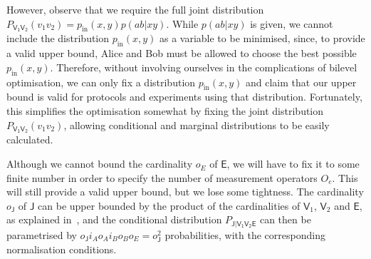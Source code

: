 \documentclass[10pt, a4paper]{article}
\numberwithin{equation}{section} %
\theoremstyle{definition}
\theoremstyle{plain}
\newcommand{\?}{\mathrel{?}} %
\newcommand{\crv}[1]{\mathsf{#1}}
\newcommand{\prin}[1][p]{#1_{\mathrm{in}}}
\begin{document}
                        However, observe that we require the full joint distribution \(P_{\crv{V_1V_2}}(v_1v_2) = \prin(x,y)p(ab|xy)\). While \(p(ab|xy)\) is given, we cannot include the distribution \(\prin(x,y)\) as a variable to be minimised, since, to provide a valid upper bound, Alice and Bob must be allowed to choose the best possible \(\prin(x,y)\). Therefore, without involving ourselves in the complications of bilevel optimisation, we can only fix a distribution \(\prin(x,y)\) and claim that our upper bound is valid for protocols and experiments using that distribution. Fortunately, this simplifies the optimisation somewhat by fixing the joint distribution \(P_{\crv{V_1V_2}}(v_1v_2)\), allowing conditional and marginal distributions to be easily calculated.

                        Although we cannot bound the cardinality \(o_E\) of \(\crv{E}\), we will have to fix it to some finite number in order to specify the number of measurement operators \(O_e\). This will still provide a valid upper bound, but we lose some tightness. The cardinality \(o_{\crv{J}}\) of \(\crv{J}\) can be upper bounded by the product of the cardinalities of \(\crv{V}_1\), \(\crv{V}_2\) and \(\crv{E}\), as explained in~\cite[Cor. 2 Proof]{ClassicalUpperBounds}, and the conditional distribution \(P_{\crv{J|V_1V_2E}}\) can then be parametrised by \(o_{\crv{J}} i_A o_A i_B o_B o_E = o_{\crv{J}}^2\) probabilities, with the corresponding normalisation conditions.
\end{document}
